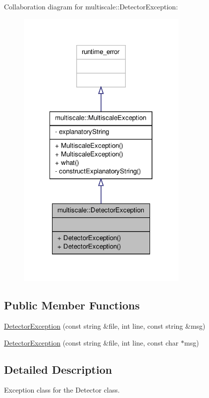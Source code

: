 Collaboration diagram for multiscale\-:\-:Detector\-Exception\-:\nopagebreak
\begin{figure}[H]
\begin{center}
\leavevmode
\includegraphics[width=234pt]{classmultiscale_1_1DetectorException__coll__graph}
\end{center}
\end{figure}
\subsection*{Public Member Functions}
\begin{DoxyCompactItemize}
\item 
\hyperlink{classmultiscale_1_1DetectorException_a7b997e90b2f84d96a94879f9ba61bf36}{Detector\-Exception} (const string \&file, int line, const string \&msg)
\item 
\hyperlink{classmultiscale_1_1DetectorException_a5f2b9b78c64aa3362faaf472ccb97cc7}{Detector\-Exception} (const string \&file, int line, const char $\ast$msg)
\end{DoxyCompactItemize}


\subsection{Detailed Description}
Exception class for the Detector class. 

